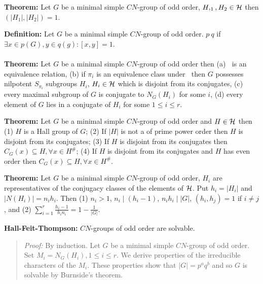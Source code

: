 {\bf Theorem:} Let $G$ be a minimal simple $CN$-group of odd order, $H,_1, H_2 \in {\cal H}$ then
$(|H_1|, |H_2|) = 1$.
\begin{quote}
\end{quote}
{\bf Definition:}
Let $G$ be a minimal simple $CN$-group of odd order.
$p~q$ if $\exists x \in p(G), y \in q(g): [x,y] = 1$.
\\
\\
{\bf Theorem:} Let $G$ be a minimal simple $CN$-group of odd order
then (a) $~$ is an
equivalence relation, (b) if $\pi_i$ is an equivalence class under $~$ then $G$ possesses
nilpotent $S_{\pi_i}$ subgroups $H_i$, $H_i \in {\cal H}$ which is disjoint from its conjugates,
(c) every maximal subgroup of $G$ is conjugate to $N_G(H_i)$ for some $i$,
(d) every element of $G$ lies in a conjugate of $H_i$ for some $1 \leq i \leq r$.
\begin{quote}
\end{quote}
{\bf Theorem:} Let $G$ be a minimal simple $CN$-group of odd order and $H \in {\cal H}$
then
(1) $H$ is a Hall group of $G$;
(2) If $|H|$ is not a of prime power order then $H$ is disjoint from its conjugates;
(3) If $H$ is disjoint from its conjugates then $C_G(x) \subseteq H, \forall x \in H^{\#}$;
(4) If $H$ is disjoint from its conjugates and $H$ has even order then $C_G(x) \subseteq H, \forall x \in H^{\#}$.
\begin{quote}
\end{quote}
{\bf Theorem:} Let $G$ be a minimal simple $CN$-group of odd order, $H_i$ are representatives of
the conjugacy classes of the elements of ${\cal H}$.  Put $h_i= |H_i|$ and
$|N(H_i)|=n_i h_i$. Then (1) $n_i > 1$, $n_i \mid (h_i - 1)$, $n_ih_i \mid |G|$, $(h_i, h_j)=1$
if $i \ne j$, and (2) $\sum_{i=1}^{r} {\frac {h_i - 1} {h_i n_i}} = 1 - {\frac 1 {|G|}}$.
\begin{quote}
\end{quote}
{\bf Hall-Feit-Thompson:} $CN$-groups of odd order are solvable.
\begin{quote}
\emph{Proof:}  By induction. Let $G$ be a minimal simple $CN$-group of odd order.
Set $M_i = N_G(H_i), 1 \leq i \leq r$.  We derive properties of the irreducible characters of
the $M_i$.
These properties show that $|G|=p^a q^b$ and so $G$ is solvable by Burnside's theorem.
\end{quote}
